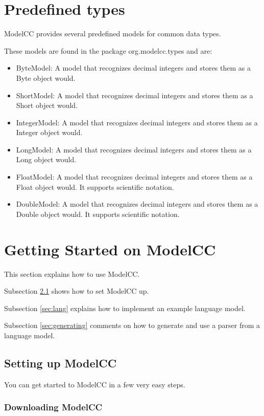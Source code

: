 \documentclass[a4paper,twoside,onecolumn]{article}
\begin{document}
\section{Predefined types} \label{sec:predefinedtypes}

ModelCC provides several predefined models for common data types.

These models are found in the package org.modelcc.types and are:

\begin{itemize}
\item ByteModel: A model that recognizes decimal integers and stores them as a Byte object would.
\item ShortModel: A model that recognizes decimal integers and stores them as a Short object would.
\item IntegerModel: A model that recognizes decimal integers and stores them as a Integer object would.
\item LongModel: A model that recognizes decimal integers and stores them as a Long object would.
\item FloatModel: A model that recognizes decimal integers and stores them as a Float object would. It supports scientific notation.
\item DoubleModel: A model that recognizes decimal integers and stores them as a Double object would. It supports scientific notation.
\end{itemize}

\section{Getting Started on ModelCC} \label{sec:gettingstarted}

This section explains how to use ModelCC.

Subsection \ref{sec:install} shows how to set ModelCC up.

Subsection \ref{sec:lang} explains how to implement an example language model.

Subsection \ref{sec:generating} comments on how to generate and use a parser from a language model.

\subsection{Setting up ModelCC} \label{sec:install}

You can get started to ModelCC in a few very easy steps.

\subsubsection{Downloading ModelCC}
\end{document}
